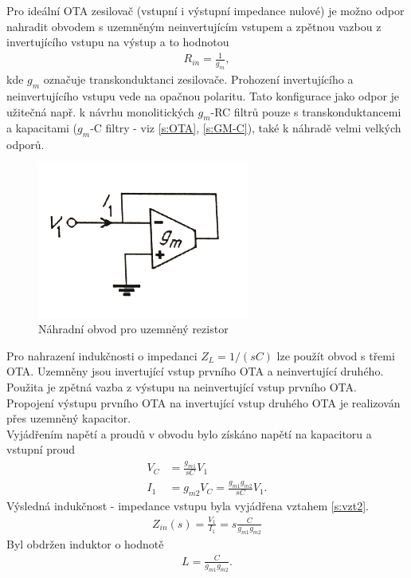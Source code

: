 \noindent Pro ideální OTA zesilovač (vstupní i výstupní impedance nulové) je možno odpor nahradit obvodem s uzemněným neinvertujícím vstupem a zpětnou vazbou z invertujícího vstupu na výstup a to hodnotou
\begin{align}
R_{in} = \frac{1}{g_{m}},
\end{align}
kde $g_{m}$ označuje transkonduktanci zesilovače. Prohození invertujícího a neinvertujícího vstupu vede na opačnou polaritu. Tato konfigurace jako odpor je užitečná např. k návrhu monolitických $g_m$-RC filtrů pouze s transkonduktancemi a kapacitami ($g_m$-C filtry - viz \ref{s:OTA}, \ref{s:GM-C}), také k náhradě velmi velkých odporů.
\begin{figure}[h]
\centering
\includegraphics[scale=0.7]{image10.png}
\caption[Náhradní obvod pro uzemněný rezistor]{Náhradní obvod pro uzemněný rezistor \cite{12}}
\end{figure}
\noindent Pro nahrazení indukčnosti o impedanci $Z_L = 1/(sC)$ lze použít obvod s třemi OTA. Uzemněny jsou invertující vstup prvního OTA a neinvertující druhého. Použita je zpětná vazba z výstupu na neinvertující vstup prvního OTA. Propojení výstupu prvního OTA na invertující vstup druhého OTA je realizován přes uzemněný kapacitor. \\
Vyjádřením napětí a proudů v obvodu bylo získáno napětí na kapacitoru a vstupní proud
\begin{align}\label{s:vzt2}
V_C &= \frac{g_{m1}}{sC}V_1 \\
I_1 &= g_{m2}V_C = \frac{g_{m1}g_{m2}}{sC}V_1.
\end{align}
Výsledná indukčnost - impedance vstupu byla vyjádřena vztahem \ref{s:vzt2}.
\begin{align}
Z_{in}(s) = \frac{V_1}{I_1} = s\frac{C}{g_{m1}g_{m2}}
\end{align}
\noindent Byl obdržen induktor o hodnotě
\begin{align}
L = \frac{C}{g_{m1}g_{m2}}.
\end{align}
